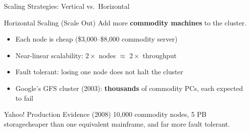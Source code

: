 \documentclass[aspectratio=169,10pt]{beamer}
\begin{document}
\begin{frame}{Scaling Strategies: Vertical vs.\ Horizontal}

      \begin{exampleblock}{Horizontal Scaling (Scale Out)}
        Add more \textbf{commodity machines} to the cluster.
        \vspace{4pt}
        \begin{itemize}
          \item Each node is cheap (\$3{,}000--\$8{,}000 commodity server)
          \item Near-linear scalability: $2\times$ nodes $\approx$ $2\times$ throughput
          \item Fault tolerant: losing one node does not halt the cluster
          \item Google's GFS cluster (2003): \textbf{thousands} of commodity PCs, each expected to fail
        \end{itemize}
      \end{exampleblock}
      \vspace{4pt}
      \begin{block}{Yahoo! Production Evidence (2008)}
        10{,}000 commodity nodes, 5 PB storage\textemdash cheaper than one equivalent mainframe, and far more fault tolerant.
      \end{block}
\end{frame}
\end{document}
